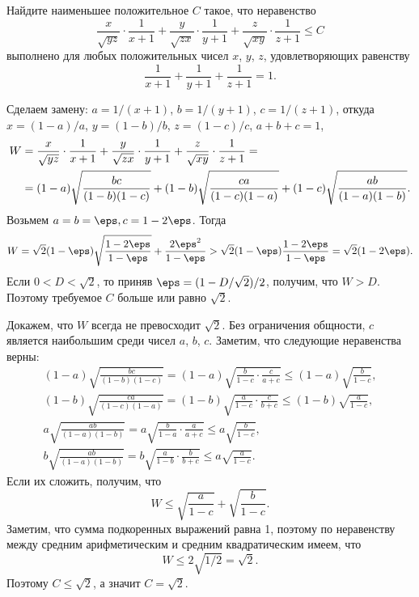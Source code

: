 \problem
Найдите наименьшее положительное $C$ такое, что неравенство
\[
    \frac{x}{\sqrt{yz}} \cdot \frac{1}{x+1}
    +
    \frac{y}{\sqrt{zx}} \cdot \frac{1}{y+1}
    +
    \frac{z}{\sqrt{xy}} \cdot \frac{1}{z+1}
\leq
    C
\]
выполнено для любых положительных чисел $x$, $y$, $z$, удовлетворяющих
равенству
\[
    \frac{1}{x+1} + \frac{1}{y+1} + \frac{1}{z+1}
=
    1
.\]

\solution
Сделаем замену:
$a = 1 / (x + 1)$, $b = 1 / (y + 1)$,  $c = 1 / (z + 1)$, откуда
$x = (1 - a) / a$, $y = (1 - b) / b$, $z = (1 - c) / c$,
$a + b + c = 1$,
\begin{align*}
    W
={}&
    \frac{x}{\sqrt{y z}} \cdot \frac{1}{x + 1}
    +
    \frac{y}{\sqrt{z x}} \cdot \frac{1}{y + 1}
    +
    \frac{z}{\sqrt{x y}} \cdot \frac{1}{z + 1}
=\\={}&
    (1 - a) \sqrt{\frac{b c \mathstrut}{(1 - b) (1 - c)}}
    +
    (1 - b) \sqrt{\frac{c a \mathstrut}{(1 - c) (1 - a)}}
    +
    (1 - c) \sqrt{\frac{a b \mathstrut}{(1 - a) (1 - b)}}
.\end{align*}
Возьмем $a = b = \eps, c = 1 - 2 \eps$.
Тогда 
\[
    W
=
    \sqrt{2} (1 - \eps) \sqrt{\frac{1 - 2 \eps}{1 - \eps}}
    +
    \frac{2{\eps}^2}{1 - \eps}
>
    \sqrt{2} (1 - \eps) \frac{1 - 2 \eps}{1 - \eps}
=
    \sqrt{2} (1 - 2 \eps).
\]
Если $0 < D < \sqrt{2}$, то приняв $\eps = (1 - D / \sqrt{2}) / 2$,
получим, что $W > D$.
Поэтому требуемое $C$ больше или равно $\sqrt{2}$.
\par
Докажем, что $W$ всегда не превосходит $\sqrt{2}$.
Без ограничения общности, $c$ является наибольшим среди чисел $a$, $b$, $c$.
Заметим, что следующие неравенства верны:
\begin{gather*}
    (1 - a) \sqrt{\frac{b c}{(1 - b) (1 - c)}}
=
    (1 - a) \sqrt{\frac{b}{1 - c} \cdot \frac{c}{a + c}}
\leq
    (1 - a) \sqrt{\frac{b}{1 - c}}
,\\
    (1 - b) \sqrt{\frac{c a}{(1 - c) (1 - a)}}
=
    (1 - b) \sqrt{\frac{a}{1 - c} \cdot \frac{c}{b + c}}
\leq
    (1 - b) \sqrt{\frac{a}{1 - c}}
,\\
    a \sqrt{\frac{a b}{(1 - a) (1 - b)}}
=
    a \sqrt{\frac{b}{1 - a} \cdot \frac{a}{a + c}}
\leq
    a \sqrt{\frac{b}{1 - c}}
,\\
    b \sqrt{\frac{a b}{(1 - a) (1 - b)}}
=
    b \sqrt{\frac{a}{1 - b} \cdot \frac{b}{b + c}}
\leq
    a \sqrt{\frac{a}{1 - c}}
.\end{gather*}
Если их сложить, получим, что 
\[
    W
\leq
    \sqrt{\frac{a}{1 - c}} + \sqrt{\frac{b}{1 - c}}
.\]
Заметим, что сумма подкоренных выражений равна 1, поэтому по неравенству
между средним арифметическим и средним квадратическим имеем, что
\[
    W
\leq
    2 \sqrt{1 / 2}
=
    \sqrt{2}
.\]
Поэтому $C \leq \sqrt{2}$, а значит $C = \sqrt{2}$.  

\endproblem
